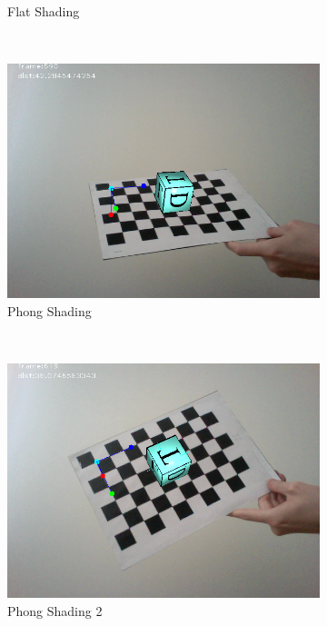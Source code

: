 \begin{figure}[h!]
\begin{subfigure}[b]{0.5\textwidth}
		\caption{Flat Shading}
		\label{subfig:flatshading}
	\end{subfigure}
	~
	\begin{subfigure}[b]{0.5\textwidth}
		\includegraphics[width=\textwidth]{Handin3/images/phong1.png}
		\caption{Phong Shading}
		\label{subfig:phongshading}
	\end{subfigure}
	~
	\begin{subfigure}[b]{0.5\textwidth}
		\includegraphics[width=\textwidth]{Handin3/images/phong2.png}
		\caption{Phong Shading 2}
		\label{subfig:phongshading2}
	\end{subfigure}
	~
	\begin{subfigure}[b]{0.5\textwidth}

\end{subfigure}
\end{figure}
